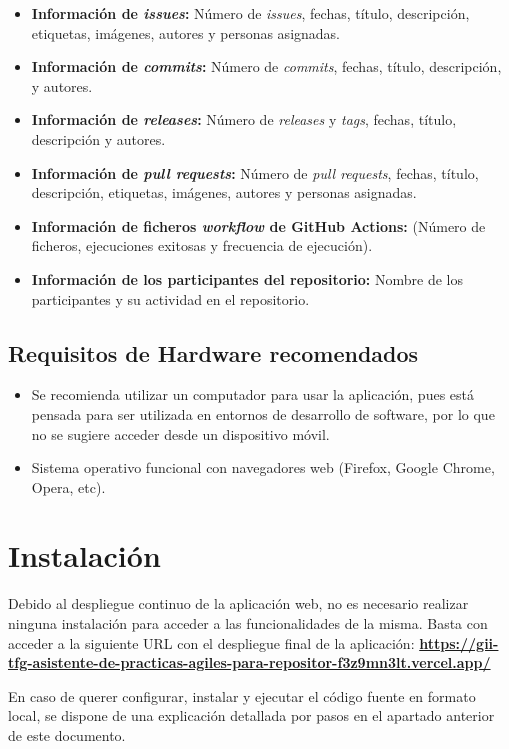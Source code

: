 \begin{itemize}
    \item \textbf{Información de \textit{issues}:} Número de \textit{issues}, fechas, título, descripción, etiquetas, imágenes, autores y personas asignadas.
    \item \textbf{Información de \textit{commits}:} Número de \textit{commits}, fechas, título, descripción, y autores.
    \item \textbf{Información de \textit{releases}:} Número de \textit{releases} y  \textit{tags}, fechas, título, descripción y autores.
    \item \textbf{Información de \textit{pull requests}:} Número de \textit{pull requests}, fechas, título, descripción, etiquetas, imágenes, autores y personas asignadas.
    \item \textbf{Información de ficheros \textit{workflow} de GitHub Actions:} (Número de ficheros, ejecuciones exitosas y frecuencia de ejecución).
    \item \textbf{Información de los participantes del repositorio:} Nombre de los participantes y su actividad en el repositorio.
\end{itemize}

\subsection*{Requisitos de Hardware recomendados}
\begin{itemize}
	\item Se recomienda utilizar un computador para usar la aplicación, pues está pensada para ser utilizada en entornos de desarrollo de software, por lo que no se sugiere acceder desde un dispositivo móvil.
	\item Sistema operativo funcional con navegadores web (Firefox, Google Chrome, Opera, etc).
\end{itemize}

\section{Instalación}

Debido al despliegue continuo de la aplicación web, no es necesario realizar ninguna instalación para acceder a las funcionalidades de la misma. Basta con acceder a la siguiente URL con el despliegue final de la aplicación: \textbf{\url{https://gii-tfg-asistente-de-practicas-agiles-para-repositor-f3z9mn3lt.vercel.app/}}

En caso de querer configurar, instalar y ejecutar el código fuente en formato local, se dispone de una explicación detallada por pasos en el apartado anterior de este documento.

